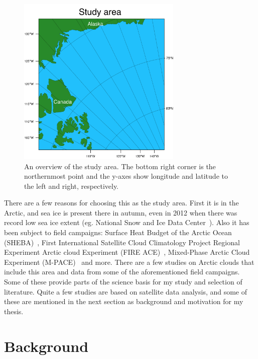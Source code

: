 \begin{figure}
\centering
\includegraphics[width=0.7\textwidth]{introduction/studyarea.png}
\caption{An overview of the study area. The bottom right corner is the northernmost point and the y-axes show longitude and latitude to the left and right, respectively.}
\label{fig:area}
\end{figure}
 
There are a few reasons for choosing this as the study area. First it is in the Arctic, and sea ice is present there in autumn, even in 2012 when there was record low sea ice extent (eg. National Snow and Ice Data Center~\citep{NSIDC}). Also it has been subject to field campaigns: Surface Heat Budget of the Arctic Ocean (SHEBA)~\citep{Uttal2002}, First International Satellite Cloud Climatology Project Regional Experiment Arctic cloud Experiment (FIRE ACE)~\citep{Curry2000}, Mixed-Phase Arctic Cloud Experiment (M-PACE)~\citep{Verlinde2007} and more. There are a few studies on Arctic clouds that include this area and data from some of the aforementioned field campaigns. Some of these provide parts of the science basis for my study and selection of literature. Quite a few studies are based on satellite data analysis, and some of these are mentioned in the next section as background and motivation for my thesis.

\section{Background}
\label{sec:background}

